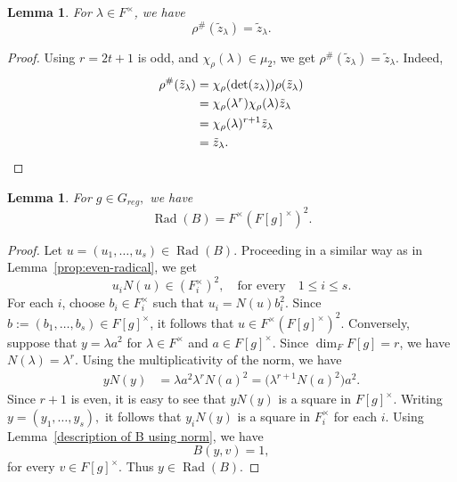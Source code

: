 \documentclass[11pt, a4paper, reqno]{amsart}
\newtheorem{lemma}[theorem]{Lemma}
\theoremstyle{definition}
\theoremstyle{remark}
\theoremstyle{example}
\theoremstyle{note}
\numberwithin{equation}{section}
\DeclareMathOperator{\Rad}{Rad}
\begin{document}
\begin{lemma} \label{rho hash fixes zlambda} For $\lambda\in F^{\times}$, we have 
$$\rho^{\#}(\tilde{z}_{\lambda}) = \tilde{z}_{\lambda}.$$
\end{lemma}

\begin{proof} Using $r=2t+1$ is odd, and $\chi_{\rho}(\lambda)\in \mu_{2}$, we get $\rho^{\#}(\tilde{z}_{\lambda})= \tilde{z}_{\lambda}$. Indeed,
\begin{align*} \rho^{\#}(\tilde{z}_{\lambda}) &=\chi_\rho(\det(z_{\lambda}))\rho(\tilde{z}_{\lambda}) \\
&=\chi_\rho(\lambda^r) \chi_\rho(\lambda)\tilde{z}_{\lambda}\\
&=\chi_\rho(\lambda)^{r+1} \tilde{z}_{\lambda}\\ 
&=\tilde{z}_{\lambda}.\qedhere
\end{align*}
\end{proof}


\begin{lemma}\label{prop:odd-radical}
For $g \in G_{reg},$ we have
\[\Rad(B)= F^{\times}(F[g]^{\times})^{2}.\]
\end{lemma}

\begin{proof} 
Let $u=(u_1,\ldots,u_s)\in\operatorname{Rad}(B)$. Proceeding in a similar way as in Lemma~\ref{prop:even-radical}, we get
\begin{equation*}
u_iN(u)\in (F_i^{\times})^{2}, \quad \text{for every} \quad 1\leq i \leq s.
\end{equation*}
For each $i$, choose $b_i\in F_i^\times$ such that $u_i=N(u)b_i^2$. Since $b:=(b_1,\ldots,b_s)\in F[g]^{\times}$, it follows that $u\in F^{\times}(F[g]^{\times})^{2}$.
Conversely, suppose that $y=\lambda a^2$ for $\lambda\in F^{\times}$ and $a\in F[g]^{\times}$. Since $\dim_F F[g]=r$, we have $N(\lambda)=\lambda^r.$ Using the multiplicativity of the norm, we have
\begin{align*}
y N(y)
&=\lambda a^{2}\lambda^{r}N(a)^{2}
= \bigl(\lambda^{r+1} N(a)^{2} \bigr) a^{2}.
\end{align*}
Since $r+1$ is even, it is easy to see that $y N(y)$ is a square in $F[g]^{\times}$. Writing $y=(y_1,\ldots,y_s),$ it follows that $y_{i}N(y)$ is a square in $F_{i}^{\times}$ for each $i$.  Using Lemma~\ref{description of B using norm}, we have  $$B(y,v)=1,$$
for every $v\in F[g]^\times$.  Thus $y\in\operatorname{Rad}(B)$.
\end{proof}
\end{document}
